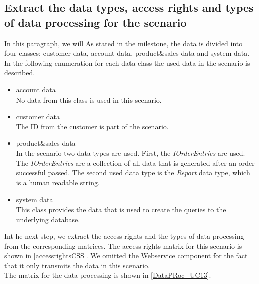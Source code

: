 \subsection{Extract the data types, access rights and types of data processing for the scenario} 
\label{accesscontrol_casestudy}
In this paragraph, we will 
As stated in the milestone, the data is divided into four classes: customer data, account data, product\&sales data and system data. In the following enumeration for each data class the used data in the scenario is described.
\begin{itemize}
\item account data \\ No data from this class is used in this scenario.
\item customer data\\ The ID from the customer is part of the scenario.
\item product\&sales data\\ In the scenario two data types are used. First, the \textit{IOrderEntries} are used. The \textit{IOrderEntries} are a collection of all data that is generated after an order successful passed.  The second used data type is the \textit{Report} data type, which is a human readable string. 
\item system data \\ This class provides the data that is used to create the queries to the underlying database.
\end{itemize}
Int he next step, we extract the access rights and the types of data processing from the corresponding matrices. The access rights matrix for this scenario is shown in \autoref{accessrightsCSS}. We omitted the Webservice component for the fact  that it only transmits the data in this scenario.\\
The matrix for the data processing is shown in \autoref{DataPRoc_UC13}.

